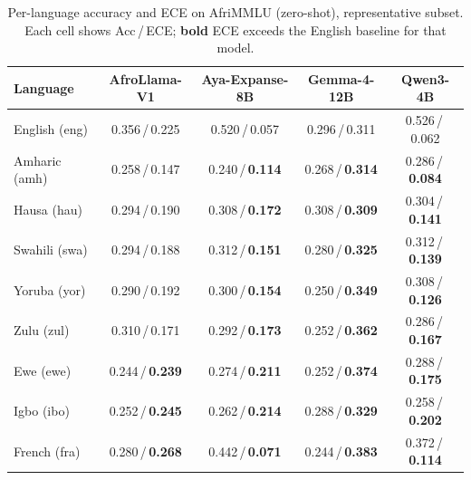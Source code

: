 \documentclass[pmlr]{jmlr}%
\begin{document}
\begin{table}[H]\centering\small
\caption{Per-language accuracy and ECE on AfriMMLU (zero-shot), representative subset. Each cell
shows Acc\,/\,ECE; \textbf{bold} ECE exceeds the English baseline for that model.}
\label{tab:afrimmlu_lang}
\begin{tabular}{lcccc}
\toprule
\textbf{Language} & \textbf{AfroLlama-V1} & \textbf{Aya-Expanse-8B} & \textbf{Gemma-4-12B} & \textbf{Qwen3-4B}\\
\midrule
English (eng) & 0.356\,/\,0.225 & 0.520\,/\,0.057 & 0.296\,/\,0.311 & 0.526\,/\,0.062\\
\midrule
Amharic (amh) & 0.258\,/\,0.147 & 0.240\,/\,\textbf{0.114} & 0.268\,/\,\textbf{0.314} & 0.286\,/\,\textbf{0.084}\\
Hausa (hau)   & 0.294\,/\,0.190 & 0.308\,/\,\textbf{0.172} & 0.308\,/\,\textbf{0.309} & 0.304\,/\,\textbf{0.141}\\
Swahili (swa) & 0.294\,/\,0.188 & 0.312\,/\,\textbf{0.151} & 0.280\,/\,\textbf{0.325} & 0.312\,/\,\textbf{0.139}\\
Yoruba (yor)  & 0.290\,/\,0.192 & 0.300\,/\,\textbf{0.154} & 0.250\,/\,\textbf{0.349} & 0.308\,/\,\textbf{0.126}\\
Zulu (zul)    & 0.310\,/\,0.171 & 0.292\,/\,\textbf{0.173} & 0.252\,/\,\textbf{0.362} & 0.286\,/\,\textbf{0.167}\\
Ewe (ewe)     & 0.244\,/\,\textbf{0.239} & 0.274\,/\,\textbf{0.211} & 0.252\,/\,\textbf{0.374} & 0.288\,/\,\textbf{0.175}\\
Igbo (ibo)    & 0.252\,/\,\textbf{0.245} & 0.262\,/\,\textbf{0.214} & 0.288\,/\,\textbf{0.329} & 0.258\,/\,\textbf{0.202}\\
French (fra)  & 0.280\,/\,\textbf{0.268} & 0.442\,/\,\textbf{0.071} & 0.244\,/\,\textbf{0.383} & 0.372\,/\,\textbf{0.114}\\
\bottomrule
\end{tabular}
\end{table}
\end{document}
